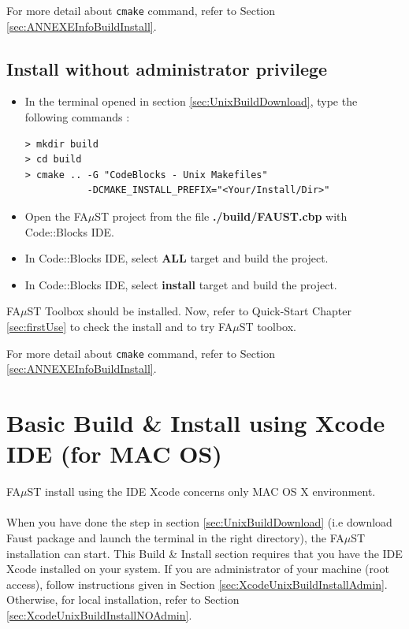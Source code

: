 For more detail about \texttt{cmake} command, refer to Section \ref{sec:ANNEXEInfoBuildInstall}.


\subsection{Install without administrator privilege}\label{sec:CodeBlocUnixBuildInstallNOAdmin}
\begin{itemize}
\item In the terminal opened in section 
\ref{sec:UnixBuildDownload}, type the following commands : 
\begin{lstlisting}
> mkdir build
> cd build
> cmake .. -G "CodeBlocks - Unix Makefiles"
  		   -DCMAKE_INSTALL_PREFIX="<Your/Install/Dir>"
\end{lstlisting}

\item Open the FA$\mu$ST project from the file \textbf{./build/FAUST.cbp} with Code::Blocks IDE. 
\item In Code::Blocks IDE, select \textbf{ALL} target and build the project. 
\item In Code::Blocks IDE, select \textbf{install} target and build the project. 
\end{itemize}

FA$\mu$ST Toolbox should be installed. Now, refer to Quick-Start Chapter \ref{sec:firstUse} to check the install and to try FA$\mu$ST toolbox.

For more detail about \texttt{cmake} command, refer to Section \ref{sec:ANNEXEInfoBuildInstall}.


\section{Basic Build \& Install using Xcode IDE (for MAC OS)}\label{sec:MacInstallXcode}

FA$\mu$ST install using the IDE Xcode concerns only MAC OS X environment.
\paragraph{}When you have done the step in section  \ref{sec:UnixBuildDownload} (i.e download Faust package and launch the terminal in the right directory),  the FA$\mu$ST installation can start. This Build \& Install section requires that you have the IDE Xcode installed on your system. If you are administrator of your machine (root access), follow instructions given in Section \ref{sec:XcodeUnixBuildInstallAdmin}. Otherwise, for local installation, refer to Section \ref{sec:XcodeUnixBuildInstallNOAdmin}. 

